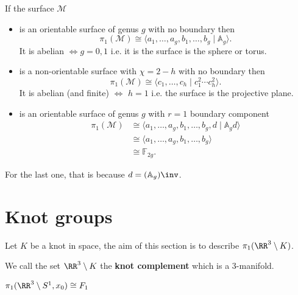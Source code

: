 \documentclass[12pt, a4paper]{article}
\begin{document}
\begin{mdprop}
    If the surface \(\mathcal{M}\)
    \begin{itemize}
        \item is an orientable surface of genus \(g\) with no boundary then 
        \[\pi_1(\mathcal{M}) \cong \langle a_1,\ldots, a_g,b_1,\ldots,b_g \mid \mathbb{A}_g\rangle.\]
        It is abelian \(\iff g=0,1\) i.e. it is the surface is the sphere or torus.
        \item is a non-orientable surface with \(\chi=2-h\) with no boundary then 
        \[\pi_1(\mathcal{M}) \cong \langle c_1,\ldots,c_h \mid c_1^2 \cdots c_h^2 \rangle.\]
        It is abelian (and finite) \(\iff\) \(h=1\) i.e. the surface is the projective plane.
        \item is an orientable surface of genus \(g\) with \(r=1\) boundary component
        \[\begin{aligned}
            \pi_1(\mathcal{M}) &\cong \langle a_1,\ldots,a_g, b_1,\ldots,b_g,d \mid \mathbb{A}_g d\rangle \\
            &\cong \langle a_1,\ldots,a_g, b_1,\ldots,b_g \rangle \\
            &\cong \mathbb{F}_{2g}.
        \end{aligned}\]
    \end{itemize}
\end{mdprop}

\begin{mdnote}
    For the last one, that is because \(d = (\mathbb{A}_g)\inv\).
\end{mdnote}

\section{Knot groups}

\begin{mdnote}
    Let \(K\) be a knot in space, the aim of this section is to describe \(\pi_1(\RR^3\setminus K)\).
\end{mdnote}

\begin{definition}
    We call the set \(\RR^3\setminus K\) the \textbf{knot complement} which is a \(3\)-manifold.
\end{definition}

\begin{proposition}
    \(\pi_1(\RR^3\setminus S^1,x_0) \cong F_1\)
\end{proposition}
\end{document}
